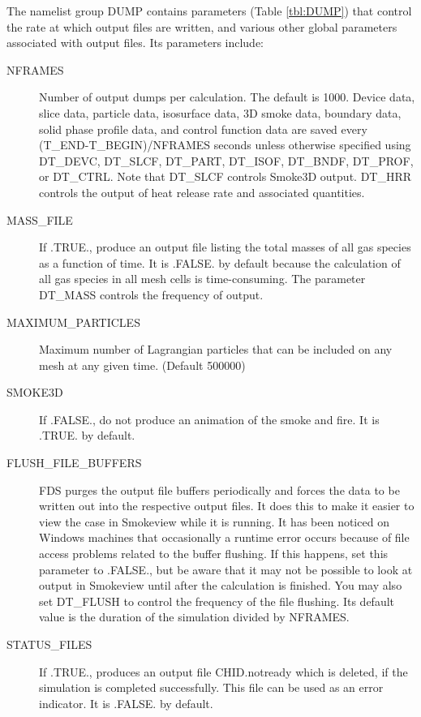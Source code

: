 \documentclass[11pt]{book}
\begin{document}
The namelist group {\ct DUMP} contains parameters (Table \ref{tbl:DUMP}) that control the rate at which output files
are written, and various other global parameters associated with output files. Its parameters include:
\begin{description}
\item[{\ct NFRAMES}] Number of output dumps per calculation. The default is 1000. Device data, slice data, particle data, isosurface data, 3D smoke data, boundary data, solid phase profile data, and control function data are saved every {\ct (T\_END-T\_BEGIN)/NFRAMES} seconds unless otherwise specified using {\ct DT\_DEVC}, {\ct DT\_SLCF}, {\ct DT\_PART}, {\ct DT\_ISOF}, {\ct DT\_BNDF}, {\ct DT\_PROF}, or {\ct DT\_CTRL}. Note that {\ct DT\_SLCF} controls Smoke3D output. {\ct DT\_HRR} controls the output of heat release rate and associated quantities.
\item[{\ct MASS\_FILE}] If {\ct .TRUE.}, produce an output file listing the total masses of all gas species as a function of time. It is {\ct .FALSE.} by default because the calculation of all gas species in all mesh cells is time-consuming. The parameter {\ct DT\_MASS} controls the frequency of output.
\item[{\ct MAXIMUM\_PARTICLES}] Maximum number of Lagrangian particles that can be included on any mesh at any given time. (Default 500000)
\item[{\ct SMOKE3D}] If {\ct .FALSE.}, do not produce an animation of the smoke and fire. It is {\ct .TRUE.} by default.
\item[{\ct FLUSH\_FILE\_BUFFERS}] FDS purges the output file buffers periodically and forces the data to be written out into the respective output files. It does this to make it easier to view the case in Smokeview while it is running. It has been noticed on Windows machines that occasionally a runtime error occurs because of file access problems related to the buffer flushing. If this happens, set this parameter to {\ct .FALSE.}, but be aware that it may not be possible to look at output in Smokeview until after the calculation is finished. You may also set {\ct DT\_FLUSH} to control the frequency of the file flushing. Its default value is the duration of the simulation divided by {\ct NFRAMES}.
\item[{\ct STATUS\_FILES}] If {\ct .TRUE.}, produces an output file {\ct CHID.notready} which is deleted, if the simulation is completed successfully. This file can be used as an error indicator. It is {\ct .FALSE.} by default.
\end{description}
\end{document}
